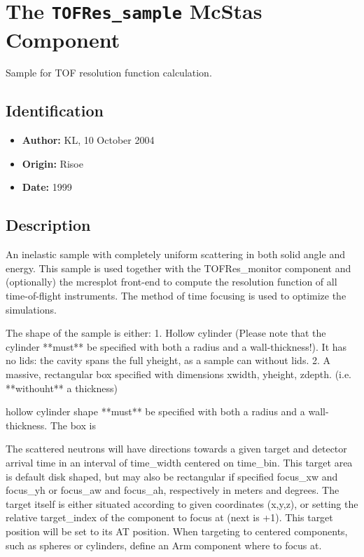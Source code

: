 \section{The \texttt{TOFRes\_sample} McStas Component}
Sample for TOF resolution function calculation.

\subsection*{Identification}
\begin{itemize}
  \item \textbf{Author:} KL, 10 October 2004
  \item \textbf{Origin:} Risoe
  \item \textbf{Date:} 1999
\end{itemize}

\subsection*{Description}
An inelastic sample with completely uniform scattering in both solid angle and energy. This sample is used together with the TOFRes\_monitor component and (optionally) the mcresplot front-end to compute the resolution function of all time-of-flight instruments. The method of time focusing is used to optimize the simulations.

The shape of the sample is either: 1. Hollow cylinder (Please note that the cylinder **must** be specified with both a radius and a wall-thickness!). It has no lids: the cavity spans the full yheight, as a sample can without lids. 2. A massive, rectangular box specified with dimensions xwidth, yheight, zdepth. (i.e. **withouht** a thickness)

hollow cylinder shape **must** be specified with both a radius and a wall-thickness. The box is

The scattered neutrons will have directions towards a given target and detector arrival time in an interval of time\_width centered on time\_bin. This target area is default disk shaped, but may also be rectangular if specified focus\_xw and focus\_yh or focus\_aw and focus\_ah, respectively in meters and degrees. The target itself is either situated according to given coordinates (x,y,z), or setting the relative target\_index of the component to focus at (next is +1). This target position will be set to its AT position. When targeting to centered components, such as spheres or cylinders, define an Arm component where to focus at.

